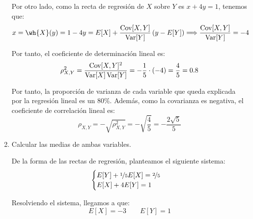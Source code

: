 \begin{ejercicio}
\begin{enumerate}
        Por otro lado, como la recta de regresión de $X$ sobre $Y$ es $x+4y=1$, tenemos que:
        \begin{equation*}
            x=\wh{X}(y) = 1-4y = E[X] + \dfrac{\Cov[X,Y]}{\Var[Y]}\left(y-E[Y]\right)
            \Longrightarrow
            \dfrac{\Cov[X,Y]}{\Var[Y]} = -4
        \end{equation*}

        Por tanto, el coeficiente de determinación lineal es:
        \begin{equation*}
            \rho_{X,Y}^2 = \dfrac{\operatorname{Cov}[X,Y]^2}{\operatorname{Var}[X]\operatorname{Var}[Y]} = -\dfrac{1}{5}\cdot (-4) = \dfrac{4}{5} = 0.8
        \end{equation*}

        Por tanto, la proporción de varianza de cada variable que queda explicada por la regresión lineal es un $80\%$. Además, como la covarianza es negativa, el coeficiente de correlación lineal es:
        \begin{equation*}
            \rho_{X,Y} = -\sqrt{\rho_{X,Y}^2} = -\sqrt{\dfrac{4}{5}} = -\dfrac{2\sqrt{5}}{5}
        \end{equation*}

        \item Calcular las medias de ambas variables.
        
        De la forma de las rectas de regresión, planteamos el siguiente sistema:
        \begin{equation*}
            \begin{cases}
                E[Y] +\nicefrac{1}{5}E[X] = \nicefrac{2}{5}\\
                E[X] +4E[Y] = 1
            \end{cases}
        \end{equation*}

        Resolviendo el sistema, llegamos a que:
        \begin{equation*}
            E[X]=-3 \qquad E[Y]=1
        \end{equation*}
    \end{enumerate}
\end{ejercicio}